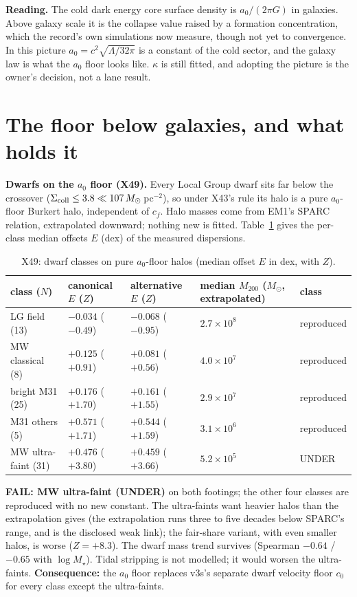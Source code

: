 \documentclass[10pt]{article}
\begin{document}
\textbf{Reading.} The cold dark energy core surface density is $a_0/(2\pi G)$ in galaxies. Above galaxy scale it is the collapse value raised by a formation concentration, which the record's own simulations now measure, though not yet to convergence. In this picture $a_0=c^2\sqrt{\Lambda/32\pi}$ is a constant of the cold sector, and the galaxy law is what the $a_0$ floor looks like. $\kappa$ is still fitted, and adopting the picture is the owner's decision, not a lane result.

\section{The floor below galaxies, and what holds it}\label{sec:floor}
\textbf{Dwarfs on the $a_0$ floor (X49).} Every Local Group dwarf sits far below the crossover ($\Sigma_{\rm coll}\le3.8\ll107\,M_\odot$\,pc$^{-2}$), so under X43's rule its halo is a pure $a_0$-floor Burkert halo, independent of $c_f$. Halo masses come from EM1's SPARC relation, extrapolated downward; nothing new is fitted. Table~\ref{tab:dwarf} gives the per-class median offsets $E$ (dex) of the measured dispersions.

\begin{table}[h]\centering\small
\caption{X49: dwarf classes on pure $a_0$-floor halos (median offset $E$ in dex, with $Z$).}\label{tab:dwarf}
\begin{tabular}{lllll}
\toprule
class ($N$) & canonical $E$ ($Z$) & alternative $E$ ($Z$) & median $M_{200}$ ($M_\odot$, extrapolated) & class\\
\midrule
LG field (13) & $-0.034$ ($-0.49$) & $-0.068$ ($-0.95$) & $2.7\times10^{8}$ & reproduced\\
MW classical (8) & $+0.125$ ($+0.91$) & $+0.081$ ($+0.56$) & $4.0\times10^{7}$ & reproduced\\
bright M31 (25) & $+0.176$ ($+1.70$) & $+0.161$ ($+1.55$) & $2.9\times10^{7}$ & reproduced\\
M31 others (5) & $+0.571$ ($+1.71$) & $+0.544$ ($+1.59$) & $3.1\times10^{6}$ & reproduced\\
MW ultra-faint (31) & $+0.476$ ($+3.80$) & $+0.459$ ($+3.66$) & $5.2\times10^{5}$ & UNDER\\
\bottomrule
\end{tabular}
\end{table}

\textbf{FAIL: MW ultra-faint (UNDER)} on both footings; the other four classes are reproduced with no new constant. The ultra-faints want heavier halos than the extrapolation gives (the extrapolation runs three to five decades below SPARC's range, and is the disclosed weak link); the fair-share variant, with even smaller halos, is worse ($Z=+8.3$). The dwarf mass trend survives (Spearman $-0.64$ / $-0.65$ with $\log M_\star$). Tidal stripping is not modelled; it would worsen the ultra-faints. \textbf{Consequence:} the $a_0$ floor replaces v3s's separate dwarf velocity floor $c_0$ for every class except the ultra-faints.
\end{document}
